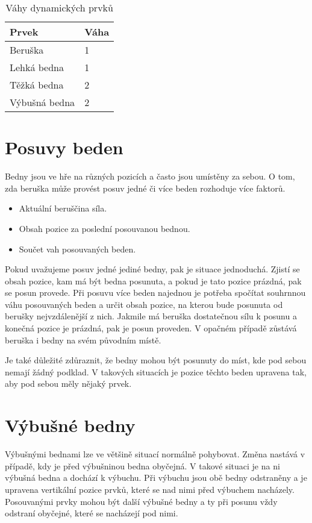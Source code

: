 \begin{table}
\label{table:weights}
\begin{center}
    \begin{tabular}{ | l | l |}
    \hline
    \textbf{Prvek} & \textbf{Váha} \\ \hline
    Beruška & 1 \\ \hline
    Lehká bedna & 1 \\ \hline
    Těžká bedna & 2 \\ \hline
	Výbušná bedna & 2 \\ \hline
    \end{tabular}

\end{center}
\caption{Váhy dynamických prvků}
\end{table}

\section{Posuvy beden}
Bedny jsou ve hře na různých pozicích a často jsou umístěny za sebou. O tom, zda beruška může provést posuv jedné či více beden rozhoduje více faktorů. 

\begin{itemize}
\item Aktuální beruščina síla. 
\item Obsah pozice za poslední posouvanou bednou.
\item Součet vah posouvaných beden.
\end{itemize} 

Pokud uvažujeme posuv jedné jediné bedny, pak je situace jednoduchá. Zjistí se obsah pozice, kam má být bedna posunuta, a pokud je tato pozice prázdná, pak se posun provede. Při posuvu více beden najednou je potřeba spočítat souhrnnou váhu posouvaných beden a určit obsah pozice, na kterou bude posunuta od berušky nejvzdálenější z nich. Jakmile má beruška dostatečnou sílu k posunu a konečná pozice je prázdná, pak je posun proveden. V opačném případě zůstává beruška i bedny na svém původním místě.

Je také důležité zdůraznit, že bedny mohou být posunuty do míst, kde pod sebou nemají žádný podklad. V takových situacích je pozice těchto beden upravena tak, aby pod sebou měly nějaký prvek.

\section{Výbušné bedny}
\label{section:explosive}
Výbušnými bednami lze ve většině situací normálně pohybovat. Změna nastává v případě, kdy je před výbušninou bedna obyčejná. V takové situaci je na ni výbušná bedna  a dochází k výbuchu. Při výbuchu jsou obě bedny odstraněny a je upravena vertikální pozice prvků, které se nad nimi před výbuchem nacházely. Posouvanými prvky mohou být další výbušné bedny a ty při posunu vždy odstraní obyčejné, které se nacházejí pod nimi. 


